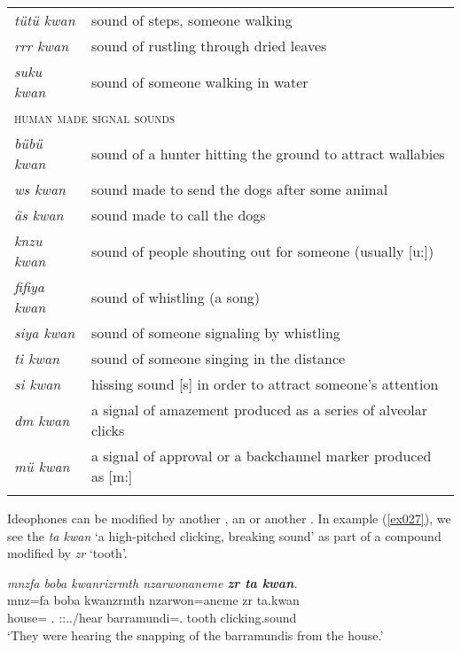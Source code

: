 {\begin{table}
\begin{tabular}{ll}
		\emph{tütü kwan}&sound of steps, someone walking\\
		\emph{rrr kwan}&sound of rustling through dried leaves\\
		\emph{suku kwan}&sound of someone walking in water\\
		\multicolumn{2}{l}{\textsc{human made signal sounds}}\\ \midrule
		\emph{bübü kwan}&sound of a hunter hitting the ground to attract wallabies\\
		\emph{ws kwan}&sound made to send the dogs after some animal\\
		\emph{äs kwan}&sound made to call the dogs\\
		\emph{knzu kwan}&sound of people shouting out for someone (usually [u:])\\
		\emph{fifiya kwan}&sound of whistling (a song)\\
		\emph{siya kwan}&sound of someone signaling by whistling\\
		\emph{ti kwan}&sound of someone singing in the distance\\
		\emph{si kwan}&hissing sound [s] in order to attract someone's attention\\
		\emph{dm kwan}&a signal of amazement produced as a series of alveolar clicks\\
		\emph{mü kwan}&a signal of approval or a backchannel marker produced as [m:]\\
		\lspbottomrule
	\end{tabular}
\end{table}}%

Ideophones can be modified by another , an  or another . In example (\ref{ex027}), we see the  \emph{ta kwan} `a high-pitched clicking, breaking sound' as part of a compound modified by \emph{zr} `tooth'.

\begin{exe}
	\ex \emph{mnzfa boba kwanrizrmth nzarwonaneme \textbf{zr ta kwan}.}\\
	\gll mnz=fa boba kwanzrmth nzarwon=aneme zr ta.kwan\\
	house=\Abl{} \Med{}.\Abl{} \Stpl:\Sbj:\Pst.\Dur.\Venit/hear barramundi=\Poss{}.\Nsg{} tooth {clicking.sound}\\
	\trans `They were hearing the snapping of the barramundis from the house.'\\
	\label{ex027}
\end{exe}

